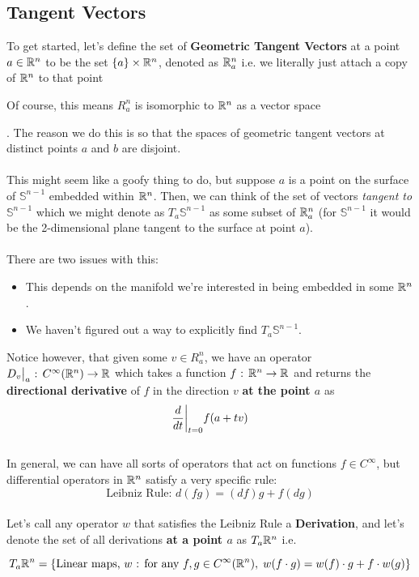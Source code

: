 \documentclass[11pt]{article}
\begin{document}
\subsection{Tangent Vectors}
To get started, let's define the set of \textbf{Geometric Tangent Vectors} at a point $a \in \mathbb{R}^n$ to be the set $\{a\} \times \mathbb{R}^n$, denoted as $\mathbb{R}^{n}_{a}$ i.e. we literally just attach a copy of $\mathbb{R}^n$ to that point  \begin{thought}
  {Of course, this means $R^{n}_{a}$ is isomorphic to $\mathbb{R}^n$ as a vector space}
\end{thought}. The reason we do this is so that the spaces of geometric tangent vectors at distinct points $a$ and $b$ are disjoint. 
\\
\\
This might seem like a goofy thing to do, but suppose $a$ is a point on the surface of $\mathbb{S}^{n-1}$ embedded within $\mathbb{R}^n$. Then, we can think of the set of vectors \emph{tangent to $\mathbb{S}^{n-1}$} which we might denote as $T_a \mathbb{S}^{n-1}$ as some subset of $\mathbb{R}^{n}_{a}$ (for $\mathbb{S}^{n-1}$ it would be the 2-dimensional plane tangent to the surface at point $a$).
\\
\\
There are two issues with this:
\begin{itemize}
  \item This depends on the manifold we're interested in being embedded in some $\mathbb{R}^n$.
  \item We haven't figured out a way to explicitly find $T_a \mathbb{S}^{n-1}$.
\end{itemize}
Notice however, that given some $v \in R^{n}_a$, we have an operator $\restr{D_v}{a} \text{ : } C^{\infty}(\R^n) \rightarrow \R$ which takes a function $f \text{ : } \mathbb{R}^n \rightarrow \mathbb{R}$ and returns the \textbf{directional derivative} of $f$ in the direction $v$ \textbf{at the point $a$} as 
\[ \restr{\frac{d}{dt}}{t = 0} f(a + tv) \]
\\
In general, we can have all sorts of operators that act on functions $f \in C^{\infty}$, but differential operators in $\mathbb{R}^n$ satisfy a very specific rule:
\[ \text{Leibniz Rule: } d(fg) = (df)g + f(dg)  \]
\\
Let's call any operator $w$ that satisfies the Leibniz Rule a \textbf{Derivation}, and let's denote the set of all derivations \textbf{at a point $a$} as $T_{a} \mathbb{R}^{n}$ i.e.
\begin{redbox}
  \[ T_{a} \mathbb{R}^{n} = \left\{\text{Linear maps, } w \text{ : } \text{for any } f, g \in C^{\infty}(\mathbb{R}^n), \; w(f \cdot g) = w(f) \cdot g + f \cdot w(g) \right\} \]
\end{redbox}
\end{document}

